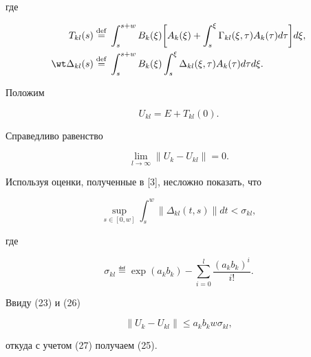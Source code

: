 $$


где


\begin{equation}


\begin{split}


T_{kl}(s)&\eqdef \int_s^{s+w}B_k(\xi)


\bigg[A_k(\xi)+\int_s^\xi\Gamma_{kl}(\xi,\tau)A_k(\tau)d\tau\bigg]d\xi,\\


\wt\Delta_{kl}(s)&\eqdef \int_s^{s+w}B_k(\xi)


\int_s^\xi\Delta_{kl}(\xi,\tau)A_k(\tau)d\tau d\xi.


\end{split}


\end{equation}


Положим


\begin{equation}


U_{kl}=E+T_{kl}(0).


\end{equation}





\begin{lem}


Справедливо равенство


\begin{equation}


\lim_{l\to\infty}\|U_k-U_{kl}\|=0.


\end{equation}


\end{lem}





\begin{pf}


Используя оценки, полученные в [3], несложно показать, что


\begin{equation}


\sup_{s\in[0,w]}\int_s^w\|\Delta_{kl}(t,s)\|dt<\sigma_{kl},


\end{equation}


где


\begin{equation}


\sigma_{kl}\eqdef \exp(a_kb_k)-\sum_{i=0}^l\frac{(a_kb_k)^i}{i!}.


\end{equation}


Ввиду (23) и (26)


\begin{equation}


\|U_k-U_{kl}\|\le a_kb_kw\sigma_{kl},


\end{equation}


откуда с учетом (27) получаем (25).


\end{pf}





